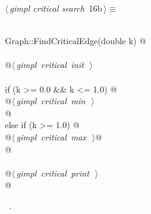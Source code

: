 \documentclass[12pt]{article}
\begin{document}
\begin{flushleft} \small
\begin{minipage}{\linewidth}\label{scrap31}\raggedright\small
{} $\langle\,${\itshape gimpl critical search}\nobreak\ {\footnotesize {16b}}$\,\rangle\equiv$
\vspace{-1ex}
\begin{list}{}{} \item
\mbox{}\verb@@\\
\mbox{}\verb@void Graph::FindCriticalEdge(double k) {@\\
\mbox{}\verb@@\\
\mbox{}\verb@    @\hbox{$\langle\,${\itshape gimpl critical init}\nobreak\ {\footnotesize {}}$\,\rangle$}\verb@@\\
\mbox{}\verb@@\\
\mbox{}\verb@    if (k >= 0.0 && k <= 1.0) {@\\
\mbox{}\verb@      @\hbox{$\langle\,${\itshape gimpl critical min}\nobreak\ {\footnotesize {}}$\,\rangle$}\verb@@\\
\mbox{}\verb@    }@\\
\mbox{}\verb@    else if (k >= 1.0) {@\\
\mbox{}\verb@      @\hbox{$\langle\,${\itshape gimpl critical max}\nobreak\ {\footnotesize {}}$\,\rangle$}\verb@  @\\
\mbox{}\verb@    }@\\
\mbox{}\verb@@\\
\mbox{}\verb@    @\hbox{$\langle\,${\itshape gimpl critical print}\nobreak\ {\footnotesize {}}$\,\rangle$}\verb@@\\
\mbox{}\verb@}@\\
\mbox{}\verb@@{\NWsep}
\end{list}
\vspace{-1.5ex}
\footnotesize
\begin{list}{}{\setlength{\itemsep}{-\parsep}\setlength{\itemindent}{-\leftmargin}}
\item \NWtxtMacroRefIn\ .

\item{}
\end{list}
\end{minipage}\vspace{4ex}
\end{flushleft}
\end{document}
